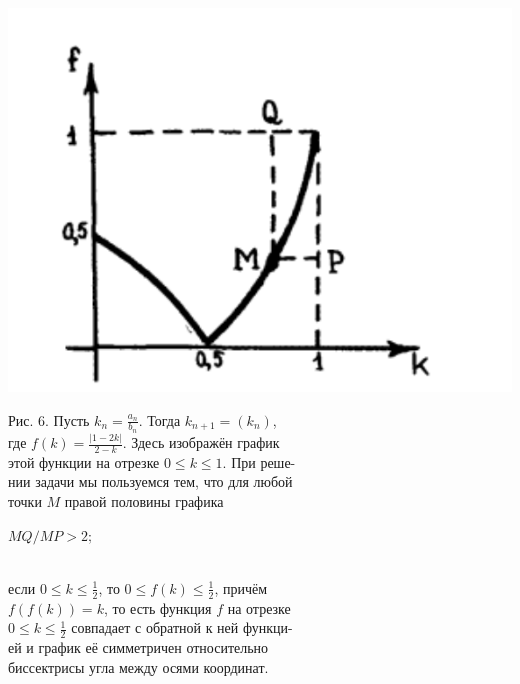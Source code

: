 \documentclass{article}
\begin{document}
\begin{multicols}{2}

\begin{left}
\includegraphics[scale=0.7]{pic.png}
\end{left}

\begin{small}
\parindent0pt Рис. 6. Пусть ${k_n=\frac{a_n}{b_n}}$. Тогда ${k_{n+1}=(k_n)}$, \\
где ${f(k)=\frac{|1-2k|}{2-k}}$. Здесь изображён график \\
этой функции на отрезке $0\leq k\leq1$. При реше- \\
нии задачи мы пользуемся тем, что для любой \\
точки $M$ правой половины графика \begin{scriptsize} $MQ/MP>2;$ \end{scriptsize} \\
если $0\leq k\leq\frac{1}{2}$, то $0\leq f(k)\leq \frac{1}{2}$, причём \\
$f(f(k))=k$, то есть функция $f$ на отрезке \\
$0\leq k\leq\frac{1}{2}$ совпадает с обратной к ней функци- \\
ей и график её симметричен относительно \\
биссектрисы угла между осями координат. \\
\hfill 
\end{small}


\end{multicols}
\end{document}
